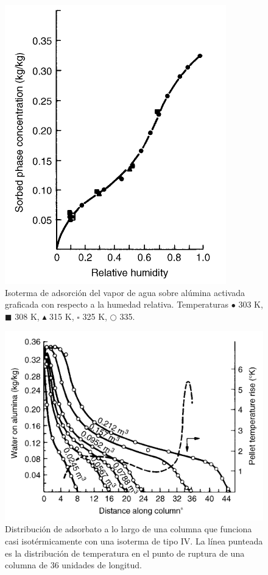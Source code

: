 \documentclass[11pt]{book}
\begin{document}
\begin{figure}
    \centering
    \includegraphics{img/adsorcion/LechoEmpacado_5.PNG}
    \caption{Isoterma de adsorción del vapor de agua sobre alúmina activada graficada con respecto a la humedad relativa. Temperaturas $\bullet$ 303 K, $\blacksquare$ 308 K, $\blacktriangle$ 315 K, $\square$ 325 K, $\bigcirc$  335.}
    \label{fig:Isoterma_Adsorcion_Curva_2}
\end{figure}

\begin{figure}[H]
    \centering
    \includegraphics{img/adsorcion/LechoEmpacado_6.PNG}
    \caption{Distribución de adsorbato a lo largo de una columna que funciona casi isotérmicamente con una isoterma de tipo IV. La línea punteada es la distribución de temperatura en el punto de ruptura de una columna de 36 unidades de longitud. }
    \label{fig:Isoterma_Adsorcion_Curva_3}
\end{figure}
\end{document}
